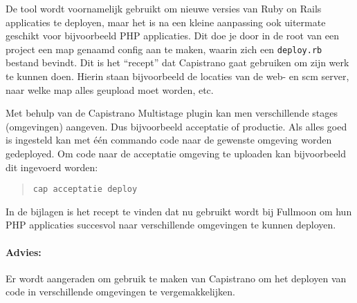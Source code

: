 De tool wordt voornamelijk gebruikt om nieuwe versies van Ruby on Rails applicaties te deployen, maar het is na een kleine aanpassing ook uitermate geschikt voor bijvoorbeeld PHP applicaties. Dit doe je door in de root van een project een map genaamd config aan te maken, waarin zich een \texttt{deploy.rb} bestand bevindt. Dit is het ``recept'' dat Capistrano gaat gebruiken om zijn werk te kunnen doen. Hierin staan bijvoorbeeld de locaties van de web- en {\sc scm} server, naar welke map alles geupload moet worden, etc.

Met behulp van de Capistrano Multistage plugin\cite{capistranomultistage} kan men verschillende stages (omgevingen) aangeven. Dus bijvoorbeeld acceptatie of productie. Als alles goed is ingesteld kan met één commando code naar de gewenste omgeving worden gedeployed. Om code naar de acceptatie omgeving te uploaden kan bijvoorbeeld dit ingevoerd worden:

\begin{quote}
  \texttt{cap acceptatie deploy}
\end{quote}

In de bijlagen is het recept te vinden dat nu gebruikt wordt bij Fullmoon om hun PHP applicaties succesvol naar verschillende omgevingen te kunnen deployen.

\paragraph{Advies:} Er wordt aangeraden om gebruik te maken van Capistrano om het deployen van code in verschillende omgevingen te vergemakkelijken.
